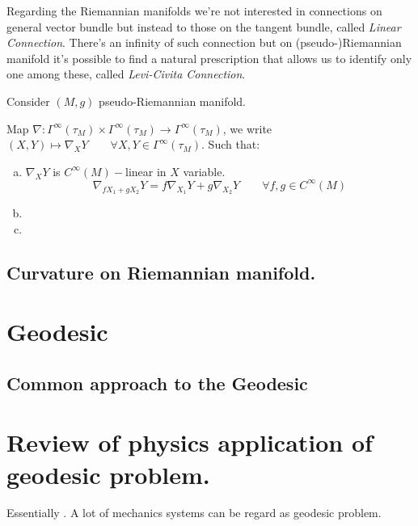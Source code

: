 \documentclass[a4paper,12pt]{scrartcl}    %
\begin{document}
 Regarding the Riemannian manifolds we're not interested in connections on general vector bundle but instead to those on the tangent bundle, called \emph{Linear Connection}.
 There's an infinity of such connection but on (pseudo-)Riemannian manifold it's possible to find a natural prescription that allows us to identify only one among these, called \emph{Levi-Civita Connection}.

Consider $(M,g)$ pseudo-Riemannian manifold.

\begin{definition}
 Map $\nabla : \Gamma^\infty(\tau_M) \times \Gamma^\infty(\tau_M) \rightarrow \Gamma^\infty(\tau_M)$,
 we write $(X,Y)\mapsto \nabla_X Y \qquad \forall X,Y \in \Gamma^\infty(\tau_M)$.
 Such that:
 \begin{enumerate}[(a)]
  \item $\nabla_X Y $ is $C^\infty(M)-$linear in $X$ variable.
   \begin{displaymath}
   \nabla_{f X_1 + g X_2}Y = f\nabla_{X_1} Y + g \nabla_{X_2} Y \qquad \forall f,g \in C^\infty(M)
   \end{displaymath}
 
  \item
  
  \item
 
 \end{enumerate}


\end{definition}

\subsection{Curvature on Riemannian manifold.}
\newpage
\section{Geodesic}
\subsection{Common approach to the Geodesic}


\newpage
\section{Review of physics application of geodesic problem.}
Essentially \cite{Abraham1978}.
\vspace{6mm}
A lot of mechanics systems can be regard as geodesic problem.
\end{document}
